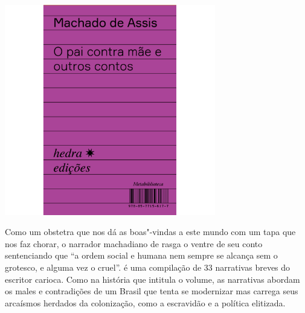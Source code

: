\hspace*{-.4cm}\begin{minipage}[c]{.5\linewidth}
\small{
{}}
\end{minipage}

\pagebreak

\hspace{.5cm}

\begin{center}
\hspace*{.5cm}\includegraphics[width=92mm]{./grid/machad.jpg}
\end{center}

\hspace*{-7cm}\hrulefill\hspace*{-7cm}

\medskip

\noindent{}Como um obstetra que nos dá as boas"-vindas a este mundo com um tapa que nos faz chorar, o narrador machadiano de {} rasga o ventre de seu conto sentenciando que “a ordem social e humana nem sempre se alcança sem o grotesco, e alguma vez o cruel”. {} é uma compilação de 33 narrativas breves do escritor carioca. Como na história que intitula o volume, as narrativas abordam os males e contradições de um Brasil que tenta se modernizar mas carrega seus arcaísmos herdados da colonização, como a escravidão e a política elitizada.

